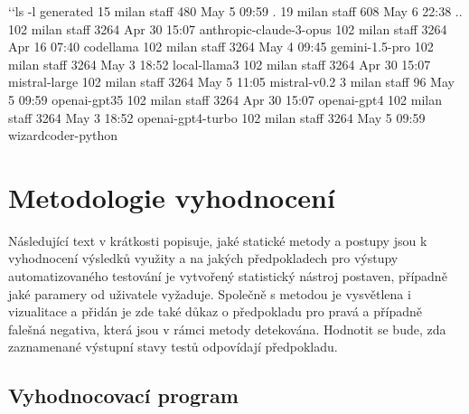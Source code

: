 \documentclass[czech, ma, kiv, he, iso690alph, pdf, viewonly]{fasthesis}
\begin{document}
    \begin{console}
`\uxprompt`ls -l generated
 15 milan  staff   480 May  5 09:59 .
 19 milan  staff   608 May  6 22:38 ..
102 milan  staff  3264 Apr 30 15:07 anthropic-claude-3-opus
102 milan  staff  3264 Apr 16 07:40 codellama
102 milan  staff  3264 May  4 09:45 gemini-1.5-pro
102 milan  staff  3264 May  3 18:52 local-llama3
102 milan  staff  3264 Apr 30 15:07 mistral-large
102 milan  staff  3264 May  5 11:05 mistral-v0.2
  3 milan  staff    96 May  5 09:59 openai-gpt35
102 milan  staff  3264 Apr 30 15:07 openai-gpt4
102 milan  staff  3264 May  3 18:52 openai-gpt4-turbo
102 milan  staff  3264 May  5 09:59 wizardcoder-python\end{console}
    
    \section{Metodologie vyhodnocení}

        Následující text v krátkosti popisuje, jaké statické metody a postupy jsou k vyhodnocení výsledků využity a na jakých předpokladech pro výstupy automatizovaného testování je vytvořený statistický nástroj postaven, případně jaké paramery od uživatele vyžaduje. Společně s metodou je vysvětlena i vizualitace a přidán je zde také důkaz o předpokladu pro pravá a případně falešná negativa, která jsou v rámci metody detekována. Hodnotit se bude, zda zaznamenané výstupní stavy testů odpovídají předpokladu.
        
        \subsection{Vyhodnocovací program} \label{sec:evaluation}
\end{document}
